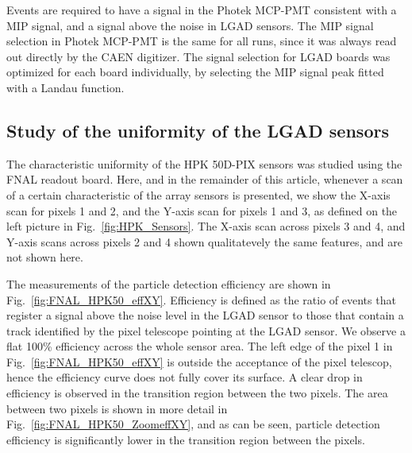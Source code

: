 \documentclass[preprint,1p]{elsarticle}
\begin{document}
Events are required to have a signal in the Photek MCP-PMT consistent with a MIP
signal, and a signal above the noise in LGAD sensors. The MIP signal selection
in Photek MCP-PMT is the same for all runs, since it was always read out
directly by the CAEN digitizer. The signal selection for LGAD boards was
optimized for each board individually, by selecting the MIP signal peak fitted
with a Landau function. 

\subsection{Study of the uniformity of the LGAD sensors}

The characteristic uniformity of the HPK 50D-PIX sensors was studied
using the FNAL readout board. Here, and in the remainder of this article,
whenever a scan of a certain characteristic of the array sensors is presented,
we show the X-axis scan for pixels 1 and 2, and the Y-axis scan for pixels 1 and
3, as defined on the left picture in Fig.~\ref{fig:HPK_Sensors}. The X-axis scan
across pixels 3 and 4, and Y-axis scans across pixels 2 and 4 shown
qualitatevely the same features, and are not shown here. 

The measurements of the particle detection efficiency are shown in
Fig.~\ref{fig:FNAL_HPK50_effXY}. Efficiency is defined as the ratio of events
that register a signal above the noise level in the LGAD sensor to those that
contain a track identified by the pixel telescope pointing at the LGAD sensor.
We observe a flat 100\% efficiency across the whole sensor area. The left edge
of the pixel 1 in Fig.~\ref{fig:FNAL_HPK50_effXY} is outside the acceptance of
the pixel telescop, hence the efficiency curve does not fully cover its surface.
A clear drop in efficiency is observed in the transition region between the two
pixels. The area between two pixels is shown in more detail in
Fig.~\ref{fig:FNAL_HPK50_ZoomeffXY}, and as can be seen, particle detection
efficiency is significantly lower in the transition region between the pixels.
\end{document}
